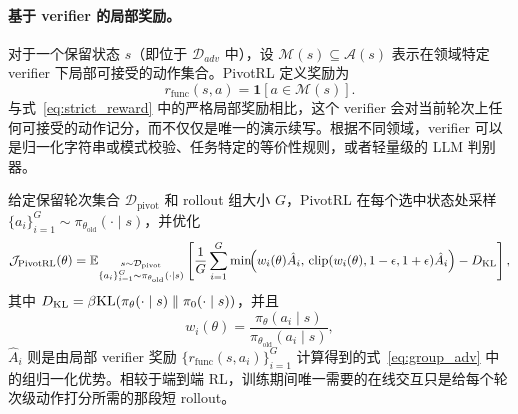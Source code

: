 \paragraph{基于 verifier 的局部奖励。}
对于一个保留状态 $s$（即位于 $\mathcal{D}_{adv}$ 中），设 $\mathcal{M}(s)\subseteq \mathcal{A}(s)$ 表示在领域特定 verifier 下局部可接受的动作集合。PivotRL 定义奖励为
\begin{equation}
r_{\mathrm{func}}(s,a)=\mathbf{1}[a\in \mathcal{M}(s)].
\label{eq:func_reward}
\end{equation}
与式~\eqref{eq:strict_reward} 中的严格局部奖励相比，这个 verifier 会对当前轮次上任何可接受的动作记分，而不仅仅是唯一的演示续写。根据不同领域，verifier 可以是归一化字符串或模式校验、任务特定的等价性规则，或者轻量级的 LLM 判别器。

给定保留轮次集合 $\mathcal{D}_{\mathrm{pivot}}$ 和 rollout 组大小 $G$，PivotRL 在每个选中状态处采样 $\{a_i\}_{i=1}^G \sim \pi_{\theta_{\mathrm{old}}}(\cdot\mid s)$，并优化
\begin{equation}
\mathcal{J}_{\mathrm{PivotRL}}(\theta)
=
\mathbb{E}_{\substack{
s\sim \mathcal{D}_{\mathrm{pivot}}\\
\{a_i\}_{i=1}^G \sim \pi_{\theta_{\mathrm{old}}}(\cdot\mid s)
}}
\left[
\frac{1}{G}
\sum_{i=1}^G
\min\!\Bigl(
w_i(\theta)\hat{A}_i,\,
\mathrm{clip}(w_i(\theta),1-\epsilon,1+\epsilon)\hat{A}_i
\Bigr)
- D_{\text{KL}}
\right],
\label{eq:pivotrl_obj}
\end{equation}
其中 $D_{\text{KL}} = \beta \mathrm{KL}(\pi_\theta(\cdot \mid s) \parallel \pi_0(\cdot \mid s))$，并且
\begin{equation}
w_i(\theta)
=
\frac{\pi_\theta(a_i\mid s)}{\pi_{\theta_{\mathrm{old}}}(a_i\mid s)},
\label{eq:importance_weight}
\end{equation}
$\hat{A}_i$ 则是由局部 verifier 奖励 $\{r_{\mathrm{func}}(s,a_i)\}_{i=1}^G$ 计算得到的式~\eqref{eq:group_adv} 中的组归一化优势。相较于端到端 RL，训练期间唯一需要的在线交互只是给每个轮次级动作打分所需的那段短 rollout。

